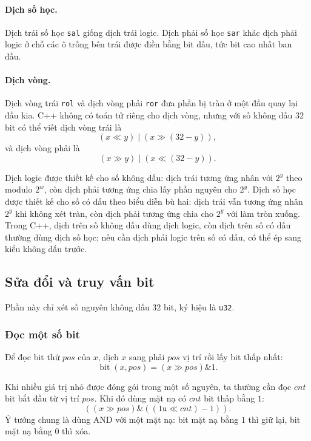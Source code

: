 \documentclass[11pt]{article}
\begin{document}
\paragraph{Dịch số học.}
Dịch trái số học \texttt{sal} giống dịch trái logic. Dịch phải số học
\texttt{sar} khác dịch phải logic ở chỗ các ô trống bên trái được điền bằng
bit dấu, tức bit cao nhất ban đầu.

\paragraph{Dịch vòng.}
Dịch vòng trái \texttt{rol} và dịch vòng phải \texttt{ror} đưa phần bị tràn ở
một đầu quay lại đầu kia. C++ không có toán tử riêng cho dịch vòng, nhưng với
số không dấu \(32\) bit có thể viết dịch vòng trái là
\[
  (x\ll y)\;|\;(x\gg(32-y)),
\]
và dịch vòng phải là
\[
  (x\gg y)\;|\;(x\ll(32-y)).
\]

Dịch logic được thiết kế cho số không dấu: dịch trái tương ứng nhân với \(2^y\)
theo modulo \(2^w\), còn dịch phải tương ứng chia lấy phần nguyên cho \(2^y\).
Dịch số học được thiết kế cho số có dấu theo biểu diễn bù hai: dịch trái vẫn
tương ứng nhân \(2^y\) khi không xét tràn, còn dịch phải tương ứng chia cho
\(2^y\) với làm tròn xuống. Trong C++, dịch trên số không dấu dùng dịch logic,
còn dịch trên số có dấu thường dùng dịch số học; nếu cần dịch phải logic trên
số có dấu, có thể ép sang kiểu không dấu trước.

\subsection{Sửa đổi và truy vấn bit}

Phần này chỉ xét số nguyên không dấu \(32\) bit, ký hiệu là \texttt{u32}.

\subsubsection{Đọc một số bit}

Để đọc bit thứ \(\mathit{pos}\) của \(x\), dịch \(x\) sang phải
\(\mathit{pos}\) vị trí rồi lấy bit thấp nhất:
\[
  \operatorname{bit}(x,\mathit{pos}) = (x\gg \mathit{pos})\&1.
\]

Khi nhiều giá trị nhỏ được đóng gói trong một số nguyên, ta thường cần đọc
\(\mathit{cnt}\) bit bắt đầu từ vị trí \(\mathit{pos}\). Khi đó dùng mặt nạ
có \(\mathit{cnt}\) bit thấp bằng \(1\):
\[
  ((x\gg \mathit{pos})\&((1\texttt{u}\ll \mathit{cnt})-1)).
\]
Ý tưởng chung là dùng AND với một mặt nạ: bit mặt nạ bằng \(1\) thì giữ lại,
bit mặt nạ bằng \(0\) thì xóa.
\end{document}
